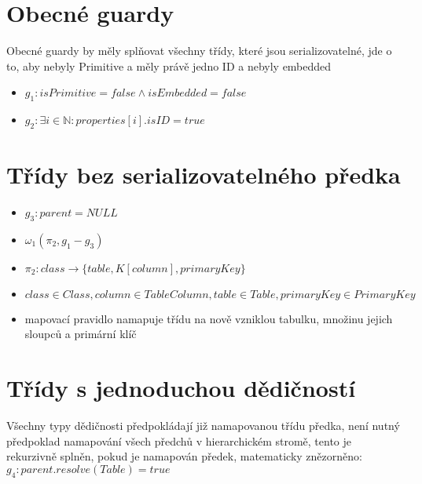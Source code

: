 \documentclass[11pt,a4paper]{article}   	%
\begin{document}
	
	\section{Obecné guardy}
		Obecné guardy by měly splňovat všechny třídy, které jsou serializovatelné, jde
		o to, aby nebyly Primitive a měly právě jedno ID a nebyly embedded
		\begin{itemize}
			\item	$g_1 : isPrimitive = false \wedge isEmbedded = false$
			\item	$g_2 : \exists i \in \mathbb{N} : properties [i] . isID = true$
		\end{itemize}
	
 	\section{Třídy bez serializovatelného předka}
 		\begin{itemize}
 			\item	$g_3 : parent = NULL$ 
 		 	\item	$\omega_1 (\pi_2, g_1 - g_3)$
 		 	\item 	$\pi_2 : class \to  \{table,  K[column], primaryKey\}$
 		 	\item 	$class \in Class, column \in TableColumn, table \in Table,
 		 			primaryKey \in PrimaryKey$
 		 	\item 	mapovací pravidlo namapuje třídu na nově vzniklou tabulku,
 		 			množinu jejich sloupců a primární klíč
 		\end{itemize}
 		 		
 	\section{Třídy s jednoduchou dědičností}
 		Všechny typy dědičnosti předpokládají již namapovanou třídu předka, není
 		nutný předpoklad namapování všech předchů v hierarchickém stromě,
 		tento je rekurzivně splněn, pokud je namapován předek, matematicky
 		znězorněno: \\ 
 		$g_4 : parent.resolve(Table) = true$
\end{document}
